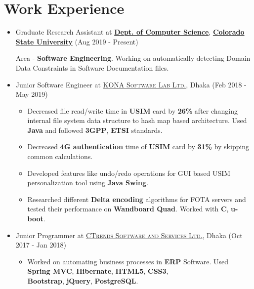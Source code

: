 \documentclass[letterpaper,10pt]{article}
\begin{document}
\section{Work Experience}
\begin{itemize}
    \item Graduate Research Assistant at \href{http://compsci.colostate.edu}{\textbf{Dept. of Computer Science}}, \href{https://www.coloslostate.edu}{\textbf{\textbf{Colorado State University}}} \hfill (Aug 2019 - Present)
    
    Area - \textbf{Software Engineering}. Working on automatically detecting Domain Data Constraints in Software Documentation files. 
    
    \item Junior Software Engineer at \href{http://www.konai.com}{\textsc{KONA Software Lab Ltd.}}, Dhaka \hfill (Feb 2018 - May 2019)
    \begin{itemize}%
         \item Decreased file read/write time in \textbf{USIM} card by \textbf{26\%} after changing internal file system data structure to hash map based architecture. Used \textbf{Java} and followed \textbf{3GPP}, \textbf{ETSI} standards.
         \item Decreased \textbf{4G authentication} time of \textbf{USIM} card by \textbf{31\%} by skipping common calculations.
         \item Developed features like undo/redo operations for GUI based USIM personalization tool using \textbf{Java Swing}.
         \item Researched different \textbf{Delta encoding} algorithms for FOTA servers and tested their performance on \textbf{Wandboard Quad}. Worked with \textbf{C}, \textbf{u-boot}.
    \end{itemize}
    
    \item Junior Programmer at \href{http://www.ctrends-software.com}{\textsc{CTrends Software and Services Ltd.}}, Dhaka \hfill (Oct 2017 - Jan 2018)
    \begin{itemize}
         \item Worked on automating business processes in \textbf{ERP} Software. Used \textbf{Spring MVC}, \textbf{Hibernate}, \textbf{HTML5}, \textbf{CSS3},\\ \textbf{Bootstrap}, \textbf{jQuery}, \textbf{PostgreSQL}.
     \end{itemize}
     
\end{itemize}
\end{document}

